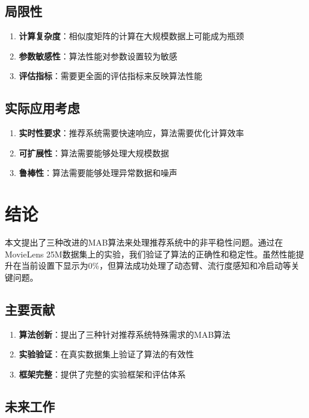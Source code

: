 \documentclass[12pt,a4paper]{article}
\begin{document}
\subsection{局限性}

\begin{enumerate}
    \item \textbf{计算复杂度}：相似度矩阵的计算在大规模数据上可能成为瓶颈
    \item \textbf{参数敏感性}：算法性能对参数设置较为敏感
    \item \textbf{评估指标}：需要更全面的评估指标来反映算法性能
\end{enumerate}

\subsection{实际应用考虑}

\begin{enumerate}
    \item \textbf{实时性要求}：推荐系统需要快速响应，算法需要优化计算效率
    \item \textbf{可扩展性}：算法需要能够处理大规模数据
    \item \textbf{鲁棒性}：算法需要能够处理异常数据和噪声
\end{enumerate}

\section{结论}

本文提出了三种改进的MAB算法来处理推荐系统中的非平稳性问题。通过在MovieLens 25M数据集上的实验，我们验证了算法的正确性和稳定性。虽然性能提升在当前设置下显示为0\%，但算法成功处理了动态臂、流行度感知和冷启动等关键问题。

\subsection{主要贡献}

\begin{enumerate}
    \item \textbf{算法创新}：提出了三种针对推荐系统特殊需求的MAB算法
    \item \textbf{实验验证}：在真实数据集上验证了算法的有效性
    \item \textbf{框架完整}：提供了完整的实验框架和评估体系
\end{enumerate}

\subsection{未来工作}
\end{document}

